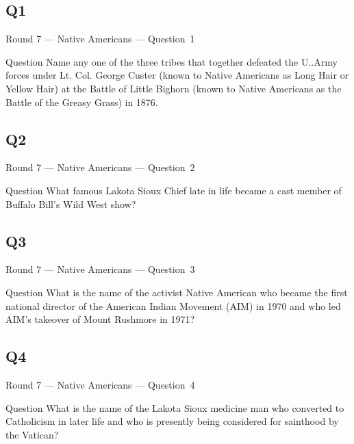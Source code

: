 \documentclass[11pt]{beamer}
\begin{document}
\subsection*{Q1}
\begin{frame}[t]{Round 7 --- Native Americans --- \mbox{Question 1}}
\vspace{-0.5em}
\begin{block}{Question}
Name any one of the three tribes that together defeated the U.\@S.\@ Army forces under Lt. Col. George Custer (known to Native Americans as Long Hair or Yellow Hair) at the Battle of Little Bighorn (known to Native Americans as the Battle of the Greasy Grass) in 1876.
\end{block}
\end{frame}
\subsection*{Q2}
\begin{frame}[t]{Round 7 --- Native Americans --- \mbox{Question 2}}
\vspace{-0.5em}
\begin{block}{Question}
What famous Lakota Sioux Chief late in life became a cast member of Buffalo Bill's Wild West show?
\end{block}
\end{frame}
\subsection*{Q3}
\begin{frame}[t]{Round 7 --- Native Americans --- \mbox{Question 3}}
\vspace{-0.5em}
\begin{block}{Question}
What is the name of the activist Native American who became the first national director of the American Indian Movement (AIM) in 1970 and who led AIM's takeover of Mount Rushmore in 1971?
\end{block}
\end{frame}
\subsection*{Q4}
\begin{frame}[t]{Round 7 --- Native Americans --- \mbox{Question 4}}
\vspace{-0.5em}
\begin{block}{Question}
What is the name of the Lakota Sioux medicine man who converted to Catholicism in later life and who is presently being considered for sainthood by the Vatican?
\end{block}
\end{frame}
\end{document}
